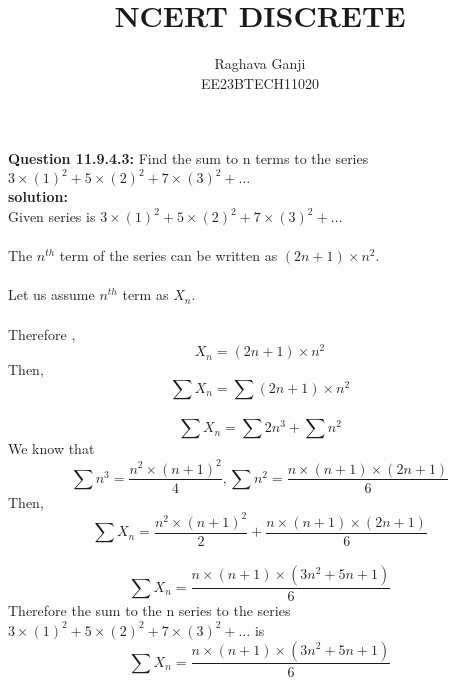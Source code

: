 \documentclass[12pt]{article}
\title{NCERT DISCRETE}
\author{Raghava Ganji\\EE23BTECH11020}
\date{}
\begin{document}
\maketitle
\textbf{Question 11.9.4.3:}
Find the sum to n terms to the series $3\times(1)^2+5\times(2)^2+7\times(3)^2+ \ldots$\\
\textbf{solution:}\\
Given series is $3\times(1)^2+5\times(2)^2+7\times(3)^2+ \ldots$\\\\
The $n^{th}$ term of the series can be written as $(2n+1)\times n^2$.\\\\
Let us assume $n^{th}$ term as $X_n$.\\\\
Therefore ,
\begin{equation}
\tag{1}
X_n=(2n+1)\times n^2
\end{equation}
Then,
\begin{equation}
\tag{2}
\sum X_n=\sum (2n+1)\times n^2
\end{equation}\\
\begin{equation}
\tag{3}
\sum X_n=\sum 2n^3 +\sum n^2
\end{equation}
We know that 
\begin{equation}
\tag{4}
\sum n^3=\frac{n^2\times(n+1)^2}{4}, \sum n^2=\frac{n\times(n+1)\times(2n+1)}{6}
\end{equation}
Then,
\begin{equation}
\tag{5}
\sum X_n=\frac{n^2\times(n+1)^2}{2} +\frac{n\times(n+1)\times(2n+1)}{6}
\end{equation}\\
\begin{equation}
\tag{6}
\sum X_n=\frac{n\times(n+1)\times(3n^2+5n+1)}{6}
\end{equation} 
Therefore the sum to the n series to the series $3\times(1)^2+5\times(2)^2+7\times(3)^2+\ldots$ is 
\begin{equation}
\tag{6}
\sum X_n=\frac{n\times(n+1)\times(3n^2+5n+1)}{6}
\end{equation}
\end{document}
